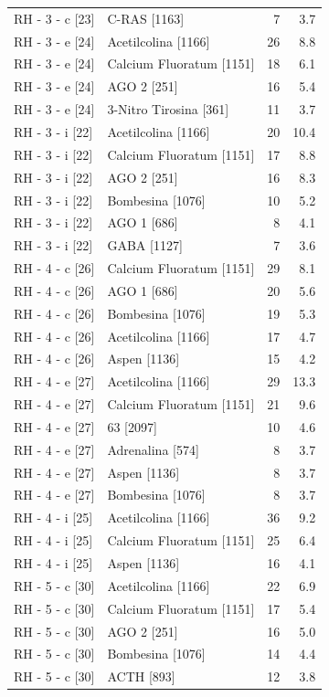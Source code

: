\documentclass[a4paper,11pt]{article}
\begin{document}
\begin{footnotesize}
\begin{longtable}{p{3.5cm}p{7.5cm}rr}
RH - 3 - c [23] & C-RAS [1163] & 7 & 3.7 \\
RH - 3 - e [24] & Acetilcolina [1166] & 26 & 8.8 \\
RH - 3 - e [24] & Calcium Fluoratum [1151] & 18 & 6.1 \\
RH - 3 - e [24] & AGO 2 [251] & 16 & 5.4 \\
RH - 3 - e [24] & 3-Nitro Tirosina [361] & 11 & 3.7 \\
RH - 3 - i [22] & Acetilcolina [1166] & 20 & 10.4 \\
RH - 3 - i [22] & Calcium Fluoratum [1151] & 17 & 8.8 \\
RH - 3 - i [22] & AGO 2 [251] & 16 & 8.3 \\
RH - 3 - i [22] & Bombesina [1076] & 10 & 5.2 \\
RH - 3 - i [22] & AGO 1 [686] & 8 & 4.1 \\
RH - 3 - i [22] & GABA [1127] & 7 & 3.6 \\
RH - 4 - c [26] & Calcium Fluoratum [1151] & 29 & 8.1 \\
RH - 4 - c [26] & AGO 1 [686] & 20 & 5.6 \\
RH - 4 - c [26] & Bombesina [1076] & 19 & 5.3 \\
RH - 4 - c [26] & Acetilcolina [1166] & 17 & 4.7 \\
RH - 4 - c [26] & Aspen [1136] & 15 & 4.2 \\
RH - 4 - e [27] & Acetilcolina [1166] & 29 & 13.3 \\
RH - 4 - e [27] & Calcium Fluoratum [1151] & 21 & 9.6 \\
RH - 4 - e [27] & 63 [2097] & 10 & 4.6 \\
RH - 4 - e [27] & Adrenalina [574] & 8 & 3.7 \\
RH - 4 - e [27] & Aspen [1136] & 8 & 3.7 \\
RH - 4 - e [27] & Bombesina [1076] & 8 & 3.7 \\
RH - 4 - i [25] & Acetilcolina [1166] & 36 & 9.2 \\
RH - 4 - i [25] & Calcium Fluoratum [1151] & 25 & 6.4 \\
RH - 4 - i [25] & Aspen [1136] & 16 & 4.1 \\
RH - 5 - c [30] & Acetilcolina [1166] & 22 & 6.9 \\
RH - 5 - c [30] & Calcium Fluoratum [1151] & 17 & 5.4 \\
RH - 5 - c [30] & AGO 2 [251] & 16 & 5.0 \\
RH - 5 - c [30] & Bombesina [1076] & 14 & 4.4 \\
RH - 5 - c [30] & ACTH [893] & 12 & 3.8 \\

\end{longtable}
\end{footnotesize}
\end{document}
